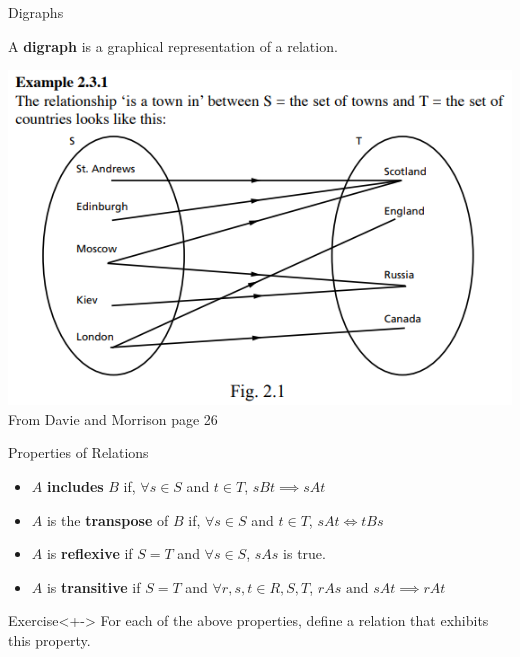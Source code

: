 \documentclass{beamer}
\begin{document}
\begin{frame}{Digraphs}

A {\bf digraph} is a graphical representation of a relation.
\begin{center}
    \includegraphics[height=0.70\textheight]{images/digraph}
    {\tiny From Davie and Morrison page 26}
\end{center}
\end{frame}

\begin{frame}{Properties of Relations}
\begin{itemize}[<+->]
    \item $A$ \textbf{includes} $B$ if, $\forall s \in S$ and $t \in T$,
        $sBt \implies sAt$
    \item $A$ is the \textbf{transpose} of $B$ if, $\forall s \in S$ and 
        $t\in T$, $sAt \iff tBs$
    \item $A$ is \textbf{reflexive} if $S=T$ and $\forall s \in S$,
        $sAs$ is true.
    \item $A$ is \textbf{transitive} if $S=T$ and 
        $\forall r,s,t \in R,S,T$, $rAs \textrm{ and }sAt \implies rAt$
\end{itemize}
\begin{block}{Exercise}<+->
    For each of the above properties, define a relation that exhibits
    this property.
\end{block}
\end{frame}
\end{document}
